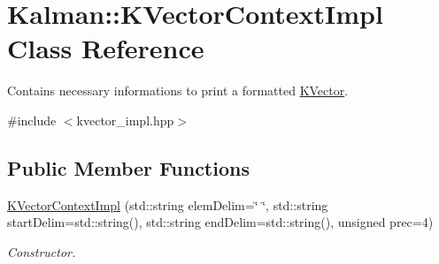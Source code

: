 \hypertarget{classKalman_1_1KVectorContextImpl}{}\section{Kalman\+:\+:K\+Vector\+Context\+Impl Class Reference}
\label{classKalman_1_1KVectorContextImpl}


Contains necessary informations to print a formatted {\ttfamily \mbox{\hyperlink{classKalman_1_1KVector}{K\+Vector}}}.  




{\ttfamily \#include $<$kvector\+\_\+impl.\+hpp$>$}

\subsection*{Public Member Functions}
\begin{DoxyCompactItemize}
\item 
\mbox{\hyperlink{classKalman_1_1KVectorContextImpl_abca4d63276cfd88f3689d94feca3332c}{K\+Vector\+Context\+Impl}} (std\+::string elem\+Delim=\char`\"{} \char`\"{}, std\+::string start\+Delim=std\+::string(), std\+::string end\+Delim=std\+::string(), unsigned prec=4)
\begin{DoxyCompactList}\small\item\em Constructor. \end{DoxyCompactList}\end{DoxyCompactItemize}
